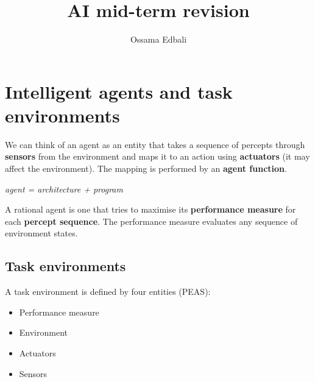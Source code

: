 \documentclass[a4paper, 11pt]{article}
\author{Ossama Edbali}
\title{AI mid-term revision}
\begin{document}
\maketitle


\section{Intelligent agents and task environments}
We can think of an agent as an entity that takes a sequence of percepts through \textbf{sensors} from the environment and maps it to an action using \textbf{actuators} (it may affect the environment). The mapping is performed by an \textbf{agent function}.

\emph{agent = architecture + program}

A rational agent is one that tries to maximise its \textbf{performance measure} for each \textbf{percept sequence}. The performance measure evaluates any sequence of environment states.

\subsection*{Task environments}
A task environment is defined by four entities (PEAS):
\begin{itemize}
  \item Performance measure
  \item Environment
  \item Actuators
  \item Sensors
\end{itemize}
\end{document}
